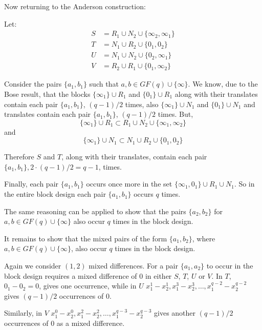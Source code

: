 \documentclass[11pt, a4paper]{book}\usepackage[]{graphicx}\usepackage[]{xcolor}
\begin{document}
Now returning to the Anderson construction:

Let:
\begin{align}
  S &= R_1 \cup N_2 \cup \{\infty _2, \infty _1\} \\
  T &= N_1 \cup R_2 \cup \{0_1, 0_2\} \\
  U &= N_1 \cup N_2 \cup \{0 _2, \infty _1\} \\
  V &= R_2 \cup R_1 \cup \{0_1, \infty _2\}
\end{align}

Consider the pairs $\{a_1, b_1\}$ such that
$a, b \in GF(q) \cup \{\infty\}$. We know,
due to the Bose result,
that the blocks
$\{\infty _1\} \cup R_1$ and $\{0 _1\} \cup R_1$
along with their translates contain each pair
$\{a_1, b_1\}$, $(q - 1)/2$ times, also
$\{\infty _1\} \cup N_1$ and
$\{0 _1\} \cup N_1$
and translates contain each pair
$\{a_1, b_1\}$, $(q - 1)/2$ times. But,
\begin{equation}
\{\infty _1\} \cup R_1 \subset R_1 \cup N_2 \cup \{\infty _1, \infty _2\}
\end{equation}
and
\begin{equation}
\{\infty _1\} \cup N_1 \subset N_1 \cup R_2 \cup \{0_1, 0_2\}
\end{equation}

Therefore $S$ and $T$, along with their translates, contain
each pair $\{a_1, b_1\}, 2\cdot (q - 1)/2 = q - 1$, times.

Finally, each pair $\{a_1, b_1\}$ occurs once more in the set
$\{\infty _1, 0_1\} \cup R_1 \cup N_1$. So in the entire
block design each pair $\{a_1, b_1\}$ occurs $q$ times.

The same reasoning can be applied to show that the pairs
$\{a_2,b_2\}$ for $a,b \in GF(q) \cup \{\infty\}$ also occur
$q$ times in the block design.

It remains to show that the mixed pairs of the form
$\{a_1, b_2\}$, where $a, b \in GF(q) \cup \{\infty\}$, also
occur $q$ times in the block design.

Again we consider $(1, 2)$
mixed differences.  For a pair $\{a_1, a_2\}$ to occur in the
block design requires a mixed difference of 0 in either $S$,
$T$, $U$ or $V$.  In $T$, $0_1 - 0_2 = 0$, gives one
occurrence, while in $U$
$x_{1}^{1} - x_{2}^{1}, x_{1}^{3} - x_{2}^{3}, \ldots, x_{1}^{q - 2} - x_{2}^{q - 2}$ gives $(q - 1)/2$ occurrences of 0.

Similarly, in $V$
$x_{1}^{0} - x_{2}^{0}, x_{1}^{2} - x_{2}^{2}, \ldots, x_{1}^{q - 3} - x_{2}^{q - 3}$
gives another $(q - 1)/2$ occurrences of 0 as a mixed
difference.
\end{document}
